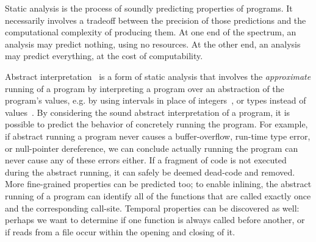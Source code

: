 Static analysis is the process of soundly predicting properties of
programs.
%
It necessarily involves a tradeoff between the precision of those
predictions and the computational complexity of producing them.
%
At one end of the spectrum, an analysis may predict nothing, using no
resources.  At the other end, an analysis may predict everything, at
the cost of computability.

Abstract interpretation~\cite{dvanhorn:Cousot:1977:AI} is a form of
static analysis that involves the \emph{approximate} running of a
program by interpreting a program over an abstraction of the program's
values, e.g. by using intervals in place of
integers~\cite{Cousot-TASE07tutorial}, or types instead of
values~\cite{dvanhorn:esop:kmf07}.
%
By considering the sound abstract interpretation of a program, it is
possible to predict the behavior of concretely running the program. 
%
For example, if abstract running a program never causes a
buffer-overflow, run-time type error, or null-pointer dereference, we
can conclude actually running the program can never cause any of these
errors either.  If a fragment of code is not executed during the
abstract running, it can safely be deemed dead-code and removed.  More
fine-grained properties can be predicted too; to enable inlining, the
abstract running of a program can identify all of the functions that
are called exactly once and the corresponding call-site.  Temporal
properties can be discovered as well: perhaps we want to determine if
one function is always called before another, or if reads from a file
occur within the opening and closing of it.








